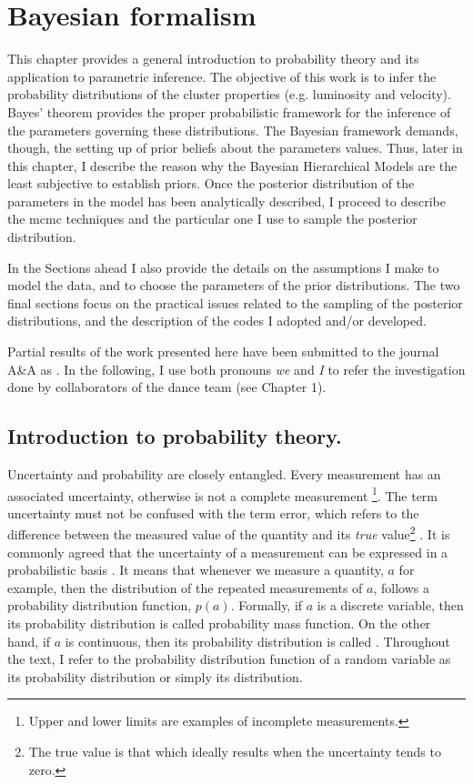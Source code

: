 \chapter{Bayesian formalism}
\label{chap:BHM}
This chapter provides a general introduction to probability theory and its application to parametric inference. The objective of this work is to infer the probability distributions of the cluster properties (e.g. luminosity and velocity). Bayes' theorem provides the proper probabilistic framework for the inference of the parameters governing these distributions. The Bayesian framework demands, though, the setting up of prior beliefs about the parameters values. Thus, later in this chapter, I  describe the reason why the Bayesian Hierarchical Models are the least subjective to establish priors. Once the posterior distribution of the parameters in the model has been analytically described, I proceed to describe the \gls{mcmc} techniques and the particular one I use to sample the posterior distribution. 

In the Sections ahead I also provide the details on the assumptions I make to model the data, and to choose the parameters of the prior distributions. The two final sections focus on the practical issues related to the sampling of the posterior distributions, and the description of the codes I adopted and/or developed.

Partial results of the work presented here have been submitted to the journal A\&A as \citet{Olivares2017}. In the following, I use both pronouns \emph{we} and \emph{I} to refer the investigation done by collaborators of the \gls{dance} team (see Chapter 1).

\section{Introduction to probability theory.}
\label{sect:introprobability}
 
Uncertainty and probability are closely entangled. Every measurement has an associated uncertainty, otherwise is not a complete measurement \footnote{Upper and lower limits are examples of incomplete measurements.}. The term uncertainty must not be confused with the term error, which refers to the difference between the measured value of the quantity and its \emph{true} value\footnote{The true value is that which ideally results when the uncertainty tends to zero.} \citep{GUM2008}. It is commonly agreed that the uncertainty of a measurement can be expressed in a probabilistic basis \citep{GUM2008}. It means that whenever we measure a quantity, $a$ for example, then the distribution of the repeated measurements of $a$, follows a probability distribution function, $p(a)$. Formally, if $a$ is a discrete variable, then its probability distribution is called probability mass function. On the other hand, if $a$ is continuous, then its probability distribution is called . Throughout the text, I refer to the probability distribution function of a random variable as its probability distribution or simply its distribution.

